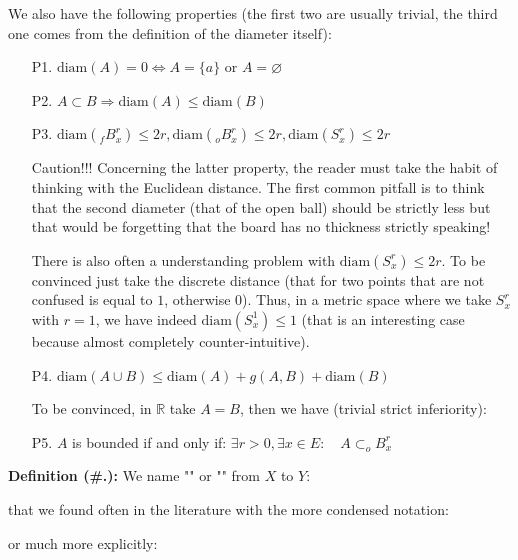 	We also have the following properties (the first two are usually trivial, the third one comes from the definition of the diameter itself):
	\begin{enumerate}
		\item[P1.] $\text{diam}(A)=0 \Leftrightarrow A=\{a\}$ or $A=\varnothing$
		
		\item[P2.] $A\subset B \Rightarrow \text{diam}(A)\leq \text{diam}(B)$
		
		\item[P3.] $\text{diam}(_fB_x^r)\leq 2r,\text{diam}(_oB_x^r)\leq 2r,\text{diam}(S_x^r)\leq 2r$
		
		\begin{tcolorbox}[enhanced,colback=red!5!white,colframe=black!50!red,boxrule=1pt,arc=0pt,outer arc=0pt,drop lifted shadow,after skip=10pt plus 2pt]
		\bcbombe Caution!!! Concerning the latter property, the reader must take the habit of thinking with the Euclidean distance. The first common pitfall is to think that the second diameter (that of the open ball) should be strictly less but that would be forgetting that the board has no thickness strictly speaking! 
		\end{tcolorbox}
		
		There is also often a understanding problem with $\text{diam}(S_x^r)\leq 2r$. To be convinced just take the discrete distance (that for two points that are not confused is equal to $1$, otherwise $0$). Thus, in a metric space where we take $S_x^r$ with $r=1$, we have indeed $\text{diam}(S_x^1)\leq 1$ (that is an interesting case because almost completely counter-intuitive).
		
		\item[P4.] $\text{diam}(A\cup B)\leq \text{diam}(A)+g(A,B)+\text{diam}(B)$
		
		To be convinced, in $\mathbb{R}$ take $A=B$, then we have (trivial strict inferiority):
		
		
		\item[P5.] $A$ is bounded if and only if: $\exists r>0,\exists x\in E:\quad A\subset _oB_x^r$
	\end{enumerate}

	\textbf{Definition (\#\thesection.\mydef):} We name "" or "" from $X$ to $Y$:
	
	that we found often in the literature with the more condensed notation:
	
	or much more explicitly:
	
